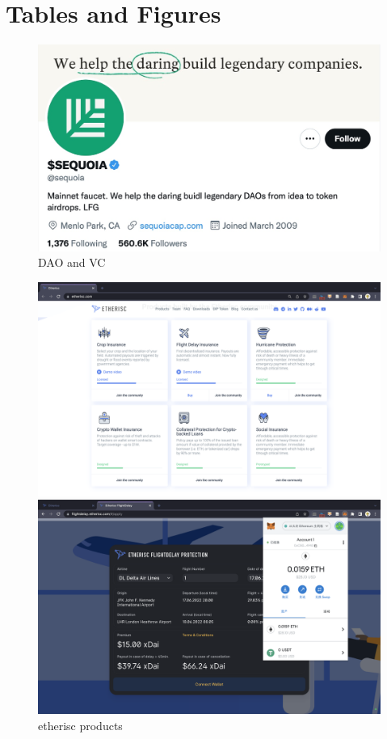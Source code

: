 \section{Tables and Figures}
\begin{figure}[htbp]
    \includegraphics[width=\linewidth]{lib/sequoia.png}
    \caption{DAO and VC}
\end{figure}
\begin{figure}[htbp]
    \centering
    \begin{minipage}[t]{0.48\linewidth}
        \includegraphics[width=\linewidth,scale=0.5]{lib/etherisc.png}
    \end{minipage}
    \begin{minipage}[t]{0.48\linewidth}
        \includegraphics[width=\linewidth,scale=0.5]{lib/delta.png}
    \end{minipage}
    \caption{etherisc products}
    \label{fig:etherisc}
\end{figure}
